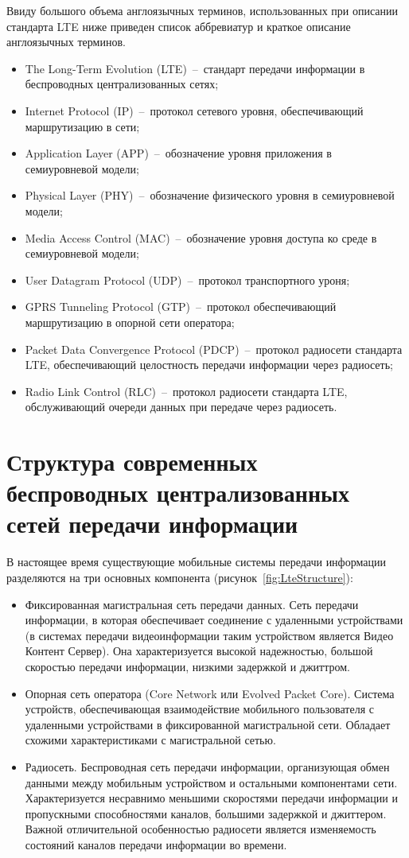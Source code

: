 Ввиду большого объема англоязычных терминов, использованных при описании стандарта LTE ниже приведен список аббревиатур и краткое описание англоязычных терминов.
\begin{itemize}
  \item The Long-Term Evolution (LTE)~--~стандарт передачи информации в беспроводных централизованных сетях;
  \item Internet Protocol (IP)~--~протокол сетевого уровня, обеспечивающий маршрутизацию в сети;
  \item Application Layer (APP)~--~обозначение уровня приложения в семиуровневой модели;
  \item Physical Layer (PHY)~--~обозначение физического уровня в семиуровневой модели;
  \item Media Access Control (MAC)~--~обозначение уровня доступа ко среде в семиуровневой модели;
  \item User Datagram Protocol (UDP)~--~протокол транспортного уроня;
  \item GPRS Tunneling Protocol (GTP)~--~протокол обеспечивающий маршрутизацию в опорной сети оператора;
  \item Packet Data Convergence Protocol (PDCP)~--~протокол радиосети стандарта LTE, обеспечивающий целостность передачи информации через радиосеть;
  \item Radio Link Control (RLC)~--~протокол радиосети стандарта LTE, обслуживающий очереди данных при передаче через радиосеть.
\end{itemize}

\section{Структура современных беспроводных централизованных сетей передачи информации}
\label{chap2:WirelessSystemStructure}

В настоящее время существующие мобильные системы передачи информации разделяются на три основных компонента (рисунок~\ref{fig:LteStructure}):
\begin{itemize}
  \item Фиксированная магистральная сеть передачи данных. Сеть передачи информации, в которая обеспечивает соединение с удаленными устройствами (в системах передачи видеоинформации таким устройством является Видео Контент Сервер). Она характеризуется высокой надежностью, большой скоростью передачи информации, низкими задержкой и джиттром.
  \item Опорная сеть оператора (Core Network или Evolved Packet Core). Система устройств, обеспечивающая взаимодействие мобильного пользователя с удаленными устройствами в фиксированной магистральной сети. Обладает схожими характеристиками с магистральной сетью.
  \item Радиосеть. Беспроводная сеть передачи информации, организующая обмен данными между мобильным устройством и остальными компонентами сети. Характеризуется несравнимо меньшими скоростями передачи информации и пропускными способностями каналов, большими задержкой и джиттером. Важной отличительной особенностью радиосети является изменяемость состояний каналов передачи информации во времени.
\end{itemize}

